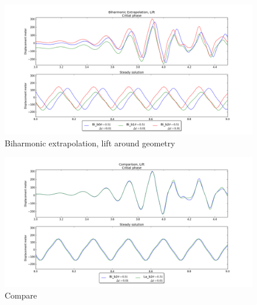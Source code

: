 \begin{figure}
  \centering
    \includegraphics[scale=0.5]{./Fig/bi_lift.png}
      \caption{Biharmonic extrapolation, lift around geometry}
\end{figure}

\begin{figure}
    \includegraphics[scale=0.5]{./Fig/compare.png}
      \caption{Compare}
\end{figure}

